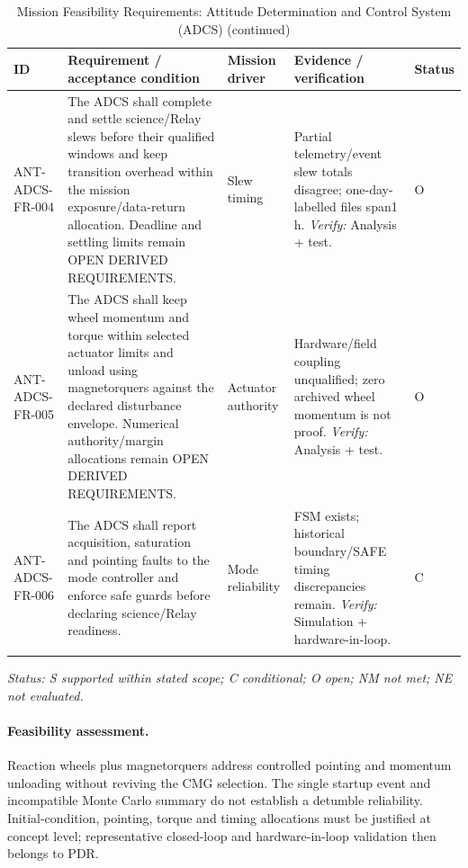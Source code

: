 \begin{table}[H]\centering\small\setlength{\tabcolsep}{3pt}
\ContinuedFloat\captionsetup{list=no}
\caption{Mission Feasibility Requirements: Attitude Determination and Control System (ADCS) (continued)}
\begin{tabular}{@{}
>{\RaggedRight\arraybackslash}p{}
>{\RaggedRight\arraybackslash}p{}
>{\RaggedRight\arraybackslash}p{}
>{\RaggedRight\arraybackslash}p{}
>{\RaggedRight\arraybackslash}p{}
@{}}
\toprule ID & Requirement / acceptance condition & Mission driver & Evidence / verification & Status\\\midrule
{}\label{req:ANT-ADCS-FR-004}\mbox{ANT-ADCS-}\newline\mbox{FR-004} & The ADCS shall complete and settle science/Relay slews before their qualified windows and keep transition overhead within the mission exposure/data-return allocation. Deadline and settling limits remain OPEN DERIVED REQUIREMENTS. & Slew timing & Partial telemetry/event slew totals disagree; one-day-labelled files span1 h. \emph{Verify:} Analysis + test. & O\\
\addlinespace[3pt]
\label{req:ANT-ADCS-FR-005}\mbox{ANT-ADCS-}\newline\mbox{FR-005} & The ADCS shall keep wheel momentum and torque within selected actuator limits and unload using magnetorquers against the declared disturbance envelope. Numerical authority/margin allocations remain OPEN DERIVED REQUIREMENTS. & Actuator authority & Hardware/field coupling unqualified; zero archived wheel momentum is not proof. \emph{Verify:} Analysis + test. & O\\
\addlinespace[3pt]
\label{req:ANT-ADCS-FR-006}\mbox{ANT-ADCS-}\newline\mbox{FR-006} & The ADCS shall report acquisition, saturation and pointing faults to the mode controller and enforce safe guards before declaring science/Relay readiness. & Mode reliability & FSM exists; historical boundary/SAFE timing discrepancies remain. \emph{Verify:} Simulation + hardware-in-loop. & C\\
\addlinespace[3pt]
\bottomrule
\end{tabular}
\end{table}
\textit{Status: S supported within stated scope; C conditional; O open; NM not met; NE not evaluated.}
\paragraph{Feasibility assessment.} Reaction wheels plus magnetorquers address controlled pointing and momentum unloading without reviving the CMG selection. The single startup event and incompatible Monte Carlo summary do not establish a detumble reliability. Initial-condition, pointing, torque and timing allocations must be justified at concept level; representative closed-loop and hardware-in-loop validation then belongs to PDR.
